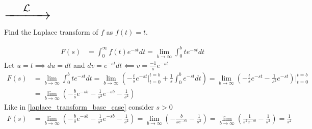 \documentclass[notes]{subfiles}
\begin{document}
\hspace{0.05\textwidth}
$\scalebox{2}{\ensuremath{\xrightarrow{\hspace{0.03\textwidth} \lap  \hspace{0.03\textwidth}}}}$
\hspace{0.05\textwidth}

\begin{exercise}
    Find the Laplace transform of $f$ as $f(t) = t$.
\end{exercise}
\begin{solution}
    \begin{align*}
        F(s)
        &= \int_0^\infty f(t)e^{-st}dt
        = \lim_{b\to\infty} \int_0^b te^{-st}dt
    \end{align*}
    Let $u = t \implies du = dt$ and $dv = e^{-st}dt \impliedby v = \frac{-1}{s}e^{-st}$
    \begin{align*}
        F(s)
        &= \lim_{b\to\infty} \int_0^b te^{-st}dt
        = \lim_{b\to\infty} \left( -\frac{t}{s}e^{-st}\Big|_{t = 0}^{t = b} + \frac{1}{s} \int_0^b e^{-st}dt \right)
        = \lim_{b\to\infty} \left( -\frac{t}{s}e^{-st} - \frac{1}{s^2} e^{-st} \right)\Bigg|_{t = 0}^{t = b} \\
        &= \lim_{b\to\infty} \left( -\frac{b}{s}e^{-sb} - \frac{1}{s^2}e^{-sb} - \frac{1}{s^2} \right)
    \end{align*}
    Like in \cref{laplace_transform_base_case} consider $s > 0$
    \begin{align*}
        F(s)
        &= \lim_{b\to\infty} \left( -\frac{b}{s}e^{-sb} - \frac{1}{s^2}e^{-sb} - \frac{1}{s^2} \right)
        = \lim_{b\to\infty} \left( -\frac{b}{se^{-sb}} - \frac{1}{s^2} \right)
        = \lim_{b\to\infty} \left( \frac{1}{s^2e^{-sb}} - \frac{1}{s^2} \right)
        = \frac{1}{s^2}
    \end{align*}
\end{solution}
\end{document}
